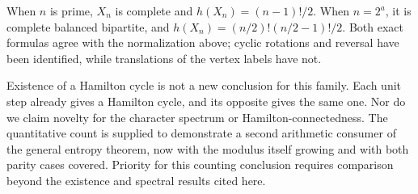 \begin{remark}
When \(n\) is prime, \(X_n\) is complete and
\(h(X_n)=(n-1)!/2\).
When \(n=2^a\), it is complete balanced bipartite, and
\(h(X_n)=(n/2)!(n/2-1)!/2\).
Both exact formulas agree with the normalization above;
cyclic rotations and reversal have been identified, while
translations of the vertex labels have not.

Existence of a Hamilton cycle is not a new conclusion for
this family. Each unit step already gives a Hamilton cycle,
and its opposite gives the same one.
Nor do we claim novelty for the character spectrum or
Hamilton-connectedness.
The quantitative count is supplied to demonstrate a second
arithmetic consumer of the general entropy theorem, now with
the modulus itself growing and with both parity cases covered.
Priority for this counting conclusion requires comparison
beyond the existence and spectral results cited here.
\end{remark}
